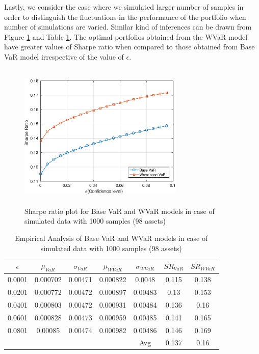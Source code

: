 Lastly, we consider the case where we simulated larger number of samples in order to distinguish the fluctuations in the performance of the portfolio when number of simulations are varied. Similar kind of inferences can be drawn from Figure \ref{fig:5.6} and Table \ref{tab:5.6}. The optimal portfolios obtained from the WVaR model have greater values of Sharpe ratio when compared to those obtained from Base VaR model irrespective of the value of $\epsilon$.

\begin{figure}[!h]
\centering
\includegraphics[height=7.0cm,width=0.7\textwidth]{VaR/bse100_simulated/sr_1000_cheb.eps}
\caption{Sharpe ratio plot for Base VaR and WVaR models in case of simulated data with 1000 samples (98 assets)}
\label{fig:5.6}
\end{figure}

\begin{table}[!h]
\centering
\captionsetup{justification=centering}
\begin{tabular}{||c|c|c|c|c|c|c||}
\hline
$\epsilon$ & $\mu_{VaR}$ & $\sigma_{VaR}$ & $\mu_{WVaR}$ & $\sigma_{WVaR}$ & $SR_{VaR}$ & $SR_{WVaR}$\\
\hline
0.0001 & 0.000702 & 0.00471 & 0.000822 & 0.0048 & 0.115 & 0.138 \\
0.0201 & 0.000772 & 0.00472 & 0.000897 & 0.00483 & 0.13 & 0.153 \\
0.0401 & 0.000803 & 0.00472 & 0.000931 & 0.00484 & 0.136 & 0.16 \\
0.0601 & 0.000828 & 0.00473 & 0.000959 & 0.00485 & 0.141 & 0.165 \\
0.0801 & 0.00085 & 0.00474 & 0.000982 & 0.00486 & 0.146 & 0.169 \\
\hline
& & & & Avg & 0.137 & 0.16 \\
\hline
\end{tabular}
\caption{Empirical Analysis of Base VaR and WVaR models in case of simulated data with 1000 samples (98 assets)}
\label{tab:5.6}
\end{table}